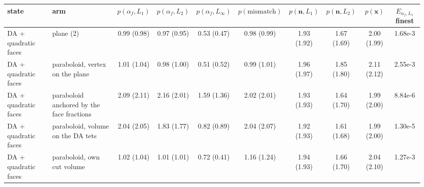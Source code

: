 \begin{tabular}{llcccccccc}
\toprule
state & arm & $p(\alpha_f, L_1)$ & $p(\alpha_f, L_2)$ & $p(\alpha_f, L_\infty)$ & $p(\text{mismatch})$ & $p(\mathbf{n}, L_1)$ & $p(\mathbf{n}, L_2)$ & $p(\mathbf{x})$ & $E_{\alpha_f, L_1}$ finest \\
\midrule
DA + quadratic faces & plane (2) & 0.99 (0.98) & 0.97 (0.95) & 0.53 (0.47) & 0.98 (0.99) & 1.93 (1.92) & 1.67 (1.69) & 2.00 (1.99) & 1.68e-3 \\
DA + quadratic faces & paraboloid, vertex on the plane & 1.01 (1.04) & 0.98 (1.00) & 0.51 (0.52) & 0.99 (1.01) & 1.96 (1.97) & 1.85 (1.80) & 2.11 (2.12) & 2.55e-3 \\
DA + quadratic faces & paraboloid anchored by the face fractions & 2.09 (2.11) & 2.16 (2.01) & 1.59 (1.36) & 2.02 (2.01) & 1.93 (1.93) & 1.64 (1.70) & 1.99 (2.00) & 8.84e-6 \\
DA + quadratic faces & paraboloid, volume on the DA tets & 2.04 (2.05) & 1.83 (1.77) & 0.82 (0.89) & 2.04 (2.07) & 1.92 (1.93) & 1.61 (1.68) & 1.99 (2.00) & 1.30e-5 \\
DA + quadratic faces & paraboloid, own cut volume & 1.02 (1.04) & 1.01 (1.01) & 0.72 (0.41) & 1.16 (1.24) & 1.94 (1.93) & 1.66 (1.70) & 2.04 (2.10) & 1.27e-3 \\
\bottomrule
\end{tabular}
